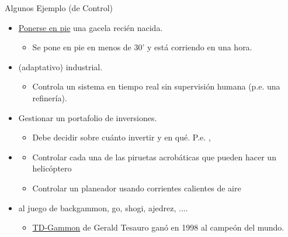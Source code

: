 \documentclass[10pt, envcountsect, handout, aspectratio=1610, hyperref={hypertexnames=true}]{beamer}
\begin{document}
\begin{frame}{Algunos Ejemplo (de Control)}

\begin{itemize}
\item \href{https://youtu.be/e0Lvw6cyug8?si=_L4XlD2mmgby_Vm2&t=145}{Ponerse en pie} una gacela recién nacida.

\begin{itemize}
\item Se pone en pie en menos de 30' y está corriendo en una hora.
\end{itemize}

\item {} (adaptativo) industrial.

\begin{itemize}
\item Controla un sistema en tiempo real sin supervisión humana (p.e. una refinería).
\end{itemize}



\item Gestionar un portafolio de inversiones.

\begin{itemize}
\item Debe decidir sobre cuánto invertir y en qué. P.e.  \citep{Uta2022Portafolio}, 
\end{itemize}



\item {}

\begin{itemize}
\item Controlar cada una de las piruetas acrobáticas que pueden hacer un helicóptero \citep{ng2004inverted} \href{https://www.youtube.com/watch?v=Idn10JBsA3Q}{\large {}}

\item Controlar un planeador usando corrientes calientes de aire \citep{linn2017science}
 \href{https://www.youtube.com/watch?v=daINKmR1M-4}{\large {}}

\end{itemize}


\item {} al juego de backgammon, go, shogi, ajedrez, .... 

\begin{itemize}
\item \href{https://en.wikipedia.org/wiki/TD-Gammon}{TD-Gammon} de  Gerald Tesauro ganó en 1998 al campeón del mundo.


\end{itemize}
\end{itemize}
\end{frame}
\end{document}
